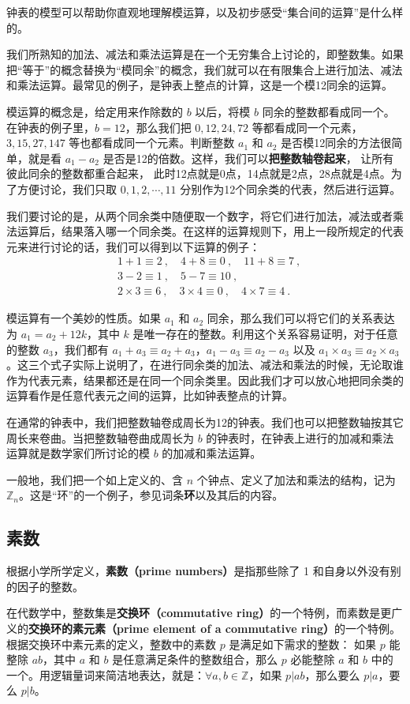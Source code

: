 钟表的模型可以帮助你直观地理解模运算，以及初步感受“集合间的运算”是什么样的。

我们所熟知的加法、减法和乘法运算是在一个无穷集合上讨论的，即整数集。如果把“等于”的概念替换为“模同余”的概念，我们就可以在有限集合上进行加法、减法和乘法运算。最常见的例子，是钟表上整点的计算，这是一个模12同余的运算。

模运算的概念是，给定用来作除数的 $b$ 以后，将模 $b$ 同余的整数都看成同一个。在钟表的例子里，$b=12$，那么我们把 $0,12,24,72$ 等都看成同一个元素，$3,15,27,147$ 等也都看成同一个元素。判断整数 $a_1$ 和 $a_2$ 是否模12同余的方法很简单，就是看 $a_1-a_2$ 是否是12的倍数。这样，我们可以\textbf{把整数轴卷起来}， 让所有彼此同余的整数都重合起来， 此时12点就是0点，14点就是2点，28点就是4点。为了方便讨论，我们只取 $0,1,2,\cdots,11$ 分别作为12个同余类的代表，然后进行运算。

我们要讨论的是，从两个同余类中随便取一个数字，将它们进行加法，减法或者乘法运算后，结果落入哪一个同余类。在这样的运算规则下，用上一段所规定的代表元来进行讨论的话，我们可以得到以下运算的例子：
\begin{equation}
\begin{aligned}
&1+1\equiv 2~, \quad 4+8\equiv 0~, \quad 11+8\equiv 7~, \\
&3-2\equiv 1~, \quad 5-7\equiv 10~, \\
&2\times 3\equiv 6~, \quad 3\times 4\equiv 0~, \quad 4\times 7\equiv 4~.
\end{aligned}
\end{equation}


模运算有一个美妙的性质。如果 $a_1$ 和 $a_2$ 同余，那么我们可以将它们的关系表达为 $a_1=a_2+12k$，其中 $k$ 是唯一存在的整数。利用这个关系容易证明，对于任意的整数 $a_3$，我们都有 $a_1+a_3\equiv a_2+a_3$，$a_1-a_3\equiv a_2-a_3$ 以及 $a_1\times a_3\equiv a_2\times a_3$。这三个式子实际上说明了，在进行同余类的加法、减法和乘法的时候，无论取谁作为代表元素，结果都还是在同一个同余类里。因此我们才可以放心地把同余类的运算看作是任意代表元之间的运算，比如钟表整点的计算。

在通常的钟表中，我们把整数轴卷成周长为12的钟表。我们也可以把整数轴按其它周长来卷曲。当把整数轴卷曲成周长为 $b$ 的钟表时，在钟表上进行的加减和乘法运算就是数学家们所讨论的模 $b$ 的加减和乘法运算。

一般地，我们把一个如上定义的、含 $n$ 个钟点、定义了加法和乘法的结构，记为 $\mathbb{Z}_n$。这是“环”的一个例子，参见词条\textbf{环}以及其后的内容。

\subsection{素数}

根据小学所学定义，\textbf{素数（prime numbers）}是指那些除了 1 和自身以外没有别的因子的整数。

在代数学中，整数集是\textbf{交换环（commutative ring）}的一个特例，而素数是更广义的\textbf{交换环的素元素（prime element of a commutative ring）}的一个特例。根据交换环中素元素的定义，整数中的素数 $p$ 是满足如下需求的整数：
如果 $p$ 能整除 $ab$，其中 $a$ 和 $b$ 是任意满足条件的整数组合，那么 $p$ 必能整除 $a$ 和 $b$ 中的一个。用逻辑量词来简洁地表达，就是：$\forall a, b\in \mathbb{Z}$，如果 $p|ab$，那么要么 $p|a$，要么 $p|b$。 
